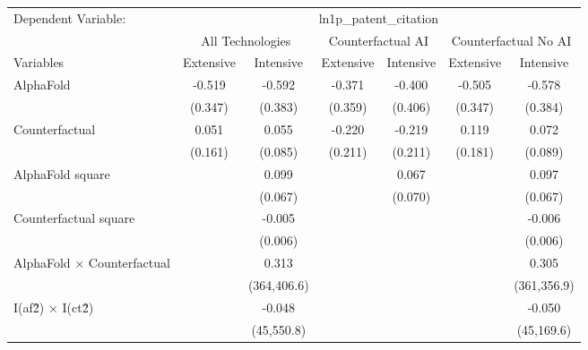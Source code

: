 \begingroup
\centering
\begin{tabular}{lcccccc}
   \tabularnewline \midrule \midrule
   Dependent Variable: & \multicolumn{6}{c}{ln1p\_patent\_citation}\\
 & \multicolumn{2}{c}{All Technologies} & \multicolumn{2}{c}{Counterfactual AI} & \multicolumn{2}{c}{Counterfactual No AI} \\
\cmidrule(lr){1-1}\cmidrule(lr){2-3} \cmidrule(lr){4-5} \cmidrule(lr){6-7}
Variables & \multicolumn{1}{c}{Extensive} & \multicolumn{1}{c}{Intensive} & \multicolumn{1}{c}{Extensive} & \multicolumn{1}{c}{Intensive} & \multicolumn{1}{c}{Extensive} & \multicolumn{1}{c}{Intensive} \\
\cmidrule(lr){1-1}\cmidrule(lr){2-2} \cmidrule(lr){3-3} \cmidrule(lr){4-4} \cmidrule(lr){5-5} \cmidrule(lr){6-6} \cmidrule(lr){7-7}
   AlphaFold                          & -0.519  & -0.592      & -0.371  & -0.400  & -0.505  & -0.578\\   
                                      & (0.347) & (0.383)     & (0.359) & (0.406) & (0.347) & (0.384)\\   
   Counterfactual                     & 0.051   & 0.055       & -0.220  & -0.219  & 0.119   & 0.072\\   
                                      & (0.161) & (0.085)     & (0.211) & (0.211) & (0.181) & (0.089)\\   
   AlphaFold square                   &         & 0.099       &         & 0.067   &         & 0.097\\   
                                      &         & (0.067)     &         & (0.070) &         & (0.067)\\   
   Counterfactual square              &         & -0.005      &         &         &         & -0.006\\   
                                      &         & (0.006)     &         &         &         & (0.006)\\   
   AlphaFold $\times$ Counterfactual  &         & 0.313       &         &         &         & 0.305\\   
                                      &         & (364,406.6) &         &         &         & (361,356.9)\\   
   I(af\^2) $\times$ I(ct\^2)         &         & -0.048      &         &         &         & -0.050\\   
                                      &         & (45,550.8)  &         &         &         & (45,169.6)\\   

\end{tabular}
